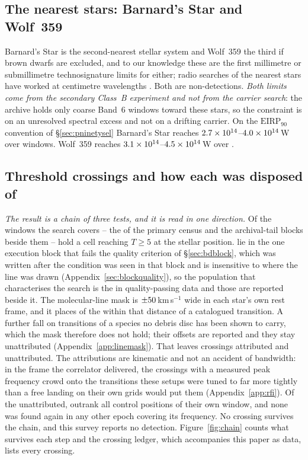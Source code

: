 \subsection{The nearest stars: Barnard's Star and Wolf~359}
\label{sec:barnardswolf}

Barnard's Star is the second-nearest stellar system and Wolf~359 the third if
brown dwarfs are excluded, and to our knowledge these are the first millimetre
or submillimetre technosignature limits for either; radio searches of
the nearest stars have worked at centimetre wavelengths \citep{Enriquez2017,
Price2020, Margot2023}. Both are non-detections. \emph{Both limits come from
the secondary Class~B experiment and not from the carrier search}: the archive
holds only coarse Band~6 windows toward these stars, so the
constraint is on an unresolved spectral excess and not on a
drifting carrier. On the $\mathrm{EIRP}_{90}$ convention of \S\ref{sec:pninetysel}
Barnard's Star reaches $2.7\times10^{14}$--$4.0\times10^{14}$\,W over
\NWinBarn{} windows. Wolf~359 reaches
$3.1\times10^{14}$--$4.5\times10^{14}$\,W over \NWinWolf.

\subsection{Threshold crossings and how each was disposed of}
\label{sec:technosearch}

\emph{The result is a chain of three tests, and it is read in one direction.}
Of the windows the search covers -- the \NWindows{} of the primary census
and the archival-tail blocks beside them -- \EvNCrossRaw{} hold a cell
reaching $T\geq5$ at the stellar position. \EvNCrossFlag{} lie in the one
execution block that fails the quality criterion of \S\ref{sec:bdblock}, which
was written after the condition was seen in that block and is insensitive to
where the line was drawn (Appendix~\ref{sec:blockquality}), so the population
that characterises the search is the \EvNCrossQp{} in quality-passing data and
those \EvNCrossFlag{} are reported beside it. The molecular-line mask is $\pm50$\,km\,s$^{-1}$ wide in each
star's own rest frame, and it places \MkNCoinc{} of the \EvNCrossQp{} within
that distance of a catalogued transition. A further \SoNCrossWord{} fall on
transitions of a species no debris disc has been shown to carry, which the
mask therefore does not hold; their offsets are reported and they stay
unattributed (Appendix~\ref{app:linemask}). That leaves
\EvNAttrQp{} crossings attributed and \EvNUnattrQp{} unattributed. The attributions are kinematic and not an accident of bandwidth: in the
frame the correlator delivered, the crossings with a measured peak frequency
crowd onto the transitions these setups were tuned to far more tightly than a
free landing on their own grids would put them (Appendix~\ref{app:rfi}). Of the unattributed,
\EvNRankQp{} outrank all \NCtrl{} control positions of their own window, and
none was found again in any other epoch covering its frequency. No
crossing survives the chain, and this survey reports no detection.
Figure~\ref{fig:chain} counts what survives each step and the crossing
ledger, which accompanies this paper as data, lists every crossing.

